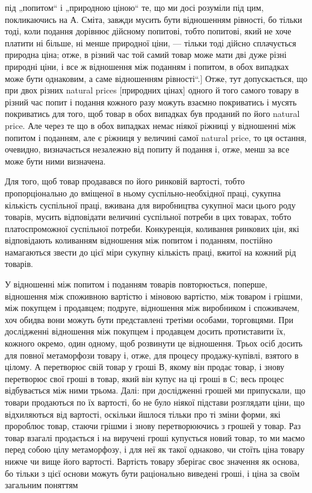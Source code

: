 \parcont{}  %
під „попитом“ і „природною ціною“ те, що ми досі розуміли під
цим, покликаючись на А. Сміта, завжди мусить бути відношенням
рівності, бо тільки тоді, коли подання дорівнює дійсному
попитові, тобто попитові, який не хоче платити ні більше,
ні менше природної ціни, — тільки тоді дійсно сплачується природна
ціна; отже, в різний час той самий товар може мати дві
дуже різні природні ціни, і все ж відношення між поданням
і попитом, в обох випадках може бути однаковим, а саме
відношенням рівності“.] Отже, тут допускається, що при двох
різних natural prices [природних цінах] одного й того самого
товару в різний час попит і подання кожного разу можуть взаємно
покриватись і мусять покриватись для того, щоб товар
в обох випадках був проданий по його natural price. Але через
те що в обох випадках немає ніякої ріжниці у відношенні між
попитом і поданням, але є ріжниця у величині самої natural
price, то ця остання, очевидно, визначається незалежно від попиту
й подання і, отже, менш за все може бути ними визначена.

Для того, щоб товар продавався по його ринковій вартості,
тобто пропорціонально до вміщеної в ньому суспільно-необхідної
праці, сукупна кількість суспільної праці, вживана для
виробництва сукупної маси цього роду товарів, мусить відповідати
величині суспільної потреби в цих товарах, тобто платоспроможної
суспільної потреби. Конкуренція, коливання ринкових
цін, які відповідають коливанням відношення між попитом
і поданням, постійно намагаються звести до цієї міри сукупну
кількість праці, вжитої на кожний рід товарів.

У відношенні між попитом і поданням товарів повторюється,
поперше, відношення між споживною вартістю і міновою вартістю,
між товаром і грішми, між покупцем і продавцем; подруге,
відношення між виробником і споживачем, хоч обидва
вони можуть бути представлені третіми особами, торговцями.
При дослідженні відношення між покупцем і продавцем досить
протиставити їх, кожного окремо, один одному, щоб розвинути
це відношення. Трьох осіб досить для повної метаморфози
товару і, отже, для процесу продажу-купівлі, взятого в цілому.
$А$ перетворює свій товар у гроші $В$, якому він продає товар,
і знову перетворює свої гроші в товар, який він купує на ці
гроші в $С$; весь процес відбувається між ними трьома. Далі:
при дослідженні грошей ми припускали, що товари продаються
по їх вартості, бо не було ніякої підстави розглядати ціни, що
відхиляються від вартості, оскільки йшлося тільки про ті зміни
форми, які пророблює товар, стаючи грішми і знову перетворюючись
з грошей у товар. Раз товар взагалі продається і на
виручені гроші купується новий товар, то ми маємо перед
собою цілу метаморфозу, і для неї як такої однаково, чи стоїть
ціна товару нижче чи вище його вартості. Вартість товару зберігає
своє значення як основа, бо тільки з цієї основи можуть бути
раціонально виведені гроші, і ціна за своїм загальним поняттям
\parbreak{}  %
